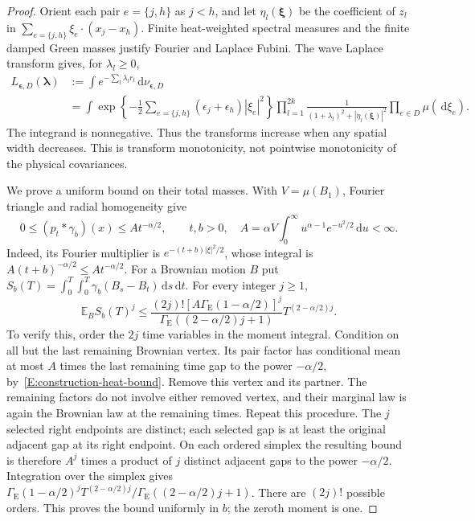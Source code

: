 \documentclass[12pt]{article}
\numberwithin{equation}{section}
\theoremstyle{definition}
\newcommand{\E}{\mathbb{E}}
\newcommand{\ud}{\,\mathrm{d}}
\begin{document}
\begin{proof}
  Orient each pair $e=\{j,h\}$ as $j<h$, and let $\eta_l(\boldsymbol\xi)$
  be the coefficient of $z_l$ in
  $\sum_{e=\{j,h\}}\xi_e\cdot(x_j-x_h)$.
  Finite heat-weighted spectral measures and the finite damped Green
  masses justify Fourier and Laplace Fubini. The wave Laplace transform
  gives, for $\lambda_l\ge0$,
  \begin{equation}\label{E:spatial-positive-laplace}
    \begin{split}
      L_{\boldsymbol\epsilon,D}(\boldsymbol\lambda)
      &:=\int e^{-\sum_l\lambda_l r_l}\ud\nu_{\boldsymbol\epsilon,D}\\
      &=\int\exp\left\{-\frac12\sum_{e=\{j,h\}}
      (\epsilon_j+\epsilon_h)|\xi_e|^2\right\}
      \prod_{l=1}^{2k}\frac1{(1+\lambda_l)^2+|\eta_l(\boldsymbol\xi)|^2}
      \prod_{e\in D}\mu(\ud\xi_e).
    \end{split}
  \end{equation}
  The integrand is nonnegative. Thus the transforms increase when any
  spatial width decreases. This is transform monotonicity, not pointwise
  monotonicity of the physical covariances.

  We prove a uniform bound on their total masses.
  With $V=\mu(B_1)$, Fourier triangle and radial homogeneity give
  \begin{equation}\label{E:construction-heat-bound}
    0\le(p_t*\gamma_b)(x)\le A t^{-\alpha/2},\qquad t,b>0,
    \quad A=\alpha V\int_0^\infty u^{\alpha-1}e^{-u^2/2}\ud u<\infty.
  \end{equation}
  Indeed, its Fourier multiplier is $e^{-(t+b)|\xi|^2/2}$, whose
  integral is $A(t+b)^{-\alpha/2}\le At^{-\alpha/2}$.
  For a Brownian motion $B$ put
  $S_b(T)=\int_0^T\int_0^T\gamma_b(B_s-B_t)\ud s\ud t$.
  For every integer $j\ge1$,
  \begin{equation}\label{E:construction-brownian-moments}
    \E_B S_b(T)^j
    \le\frac{(2j)![A\Gamma_{\mathrm E}(1-\alpha/2)]^j}
    {\Gamma_{\mathrm E}((2-\alpha/2)j+1)}T^{(2-\alpha/2)j}.
  \end{equation}
  To verify this, order the $2j$ time variables in the moment integral.
  Condition on all but the last remaining Brownian vertex. Its pair
  factor has conditional mean at most $A$ times the last remaining
  time gap to the power $-\alpha/2$, by~\eqref{E:construction-heat-bound}.
  Remove this vertex and its partner. The remaining factors do not
  involve either removed vertex, and their marginal law is again the
  Brownian law at the remaining times. Repeat this procedure.
  The $j$ selected right endpoints are distinct; each selected gap is
  at least the original adjacent gap at its right endpoint.
  On each ordered simplex the resulting bound is therefore $A^j$
  times a product of $j$ distinct adjacent gaps to the power
  $-\alpha/2$. Integration over the simplex gives
  $\Gamma_{\mathrm E}(1-\alpha/2)^j
  T^{(2-\alpha/2)j}/\Gamma_{\mathrm E}((2-\alpha/2)j+1)$.
  There are $(2j)!$ possible orders. This proves the bound uniformly
  in $b$; the zeroth moment is one.


\end{proof}
\end{document}
